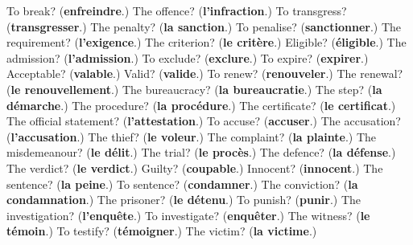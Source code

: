 \begin{tcolorbox}[breakable,colback=teal!4,colframe=teal!35!black,title={Before you move on}]
To break? (\textbf{enfreindre}.) The offence? (\textbf{l'infraction}.) To transgress? (\textbf{transgresser}.) The penalty? (\textbf{la sanction}.) To penalise? (\textbf{sanctionner}.) The requirement? (\textbf{l'exigence}.) The criterion? (\textbf{le critère}.) Eligible? (\textbf{éligible}.) The admission? (\textbf{l'admission}.) To exclude? (\textbf{exclure}.) To expire? (\textbf{expirer}.) Acceptable? (\textbf{valable}.) Valid? (\textbf{valide}.) To renew? (\textbf{renouveler}.) The renewal? (\textbf{le renouvellement}.) The bureaucracy? (\textbf{la bureaucratie}.) The step? (\textbf{la démarche}.) The procedure? (\textbf{la procédure}.) The certificate? (\textbf{le certificat}.) The official statement? (\textbf{l'attestation}.) To accuse? (\textbf{accuser}.) The accusation? (\textbf{l'accusation}.) The thief? (\textbf{le voleur}.) The complaint? (\textbf{la plainte}.) The misdemeanour? (\textbf{le délit}.) The trial? (\textbf{le procès}.) The defence? (\textbf{la défense}.) The verdict? (\textbf{le verdict}.) Guilty? (\textbf{coupable}.) Innocent? (\textbf{innocent}.) The sentence? (\textbf{la peine}.) To sentence? (\textbf{condamner}.) The conviction? (\textbf{la condamnation}.) The prisoner? (\textbf{le détenu}.) To punish? (\textbf{punir}.) The investigation? (\textbf{l'enquête}.) To investigate? (\textbf{enquêter}.) The witness? (\textbf{le témoin}.) To testify? (\textbf{témoigner}.) The victim? (\textbf{la victime}.)
\end{tcolorbox}
